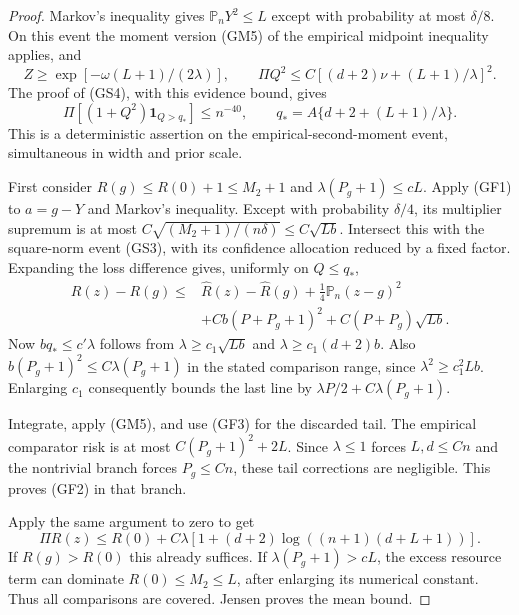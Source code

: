 \begin{proof}
Markov's inequality gives $\mathbb P_nY^2\le L$ except with
probability at most $\delta/8$. On this event the moment version
(GM5) of the empirical midpoint inequality applies, and
\[
 Z\ge\exp[-\omega(L+1)/(2\lambda)],\qquad
 \Pi Q^2\le C[(d+2)\nu+(L+1)/\lambda]^2.
\]
The proof of (GS4), with this evidence bound, gives
\[
 \Pi[(1+Q^2)\mathbf1_{Q>q_*}]\le n^{-40},\qquad
 q_*=A\{d+2+(L+1)/\lambda\}.                           \tag{GF3}
\]
This is a deterministic assertion on the empirical-second-moment
event, simultaneous in width and prior scale.

First consider $R(g)\le R(0)+1\le M_2+1$ and
$\lambda(P_g+1)\le cL$. Apply (GF1) to $a=g-Y$ and Markov's
inequality. Except with probability $\delta/4$, its multiplier
supremum is at most $C\sqrt{(M_2+1)/(n\delta)}\le C\sqrt{Lb}$.
Intersect this with the square-norm event (GS3), with its confidence
allocation reduced by a fixed factor. Expanding the loss difference
gives, uniformly on $Q\le q_*$,
\begin{align*}
 R(z)-R(g)\le{}&\widehat R(z)-\widehat R(g)
       +\tfrac14\mathbb P_n(z-g)^2\\
       &+Cb(P+P_g+1)^2+C(P+P_g)\sqrt{Lb}.
\end{align*}
Now $bq_*\le c'\lambda$ follows from
$\lambda\ge c_1\sqrt{Lb}$ and $\lambda\ge c_1(d+2)b$.
Also $b(P_g+1)^2\le C\lambda(P_g+1)$ in the stated comparison
range, since $\lambda^2\ge c_1^2Lb$.
Enlarging $c_1$ consequently bounds the last line by
$\lambda P/2+C\lambda(P_g+1)$.

Integrate, apply (GM5), and use (GF3) for the discarded tail.
The empirical comparator risk is at most $C(P_g+1)^2+2L$.
Since $\lambda\le1$ forces $L,d\le Cn$ and the nontrivial branch
forces $P_g\le Cn$, these tail corrections are negligible.
This proves (GF2) in that branch.

Apply the same argument to zero to get
\[
 \Pi R(z)\le R(0)+C\lambda
              [1+(d+2)\log((n+1)(d+L+1))].
\]
If $R(g)>R(0)$ this already suffices. If
$\lambda(P_g+1)>cL$, the excess resource term can dominate
$R(0)\le M_2\le L$, after enlarging its numerical constant.
Thus all comparisons are covered. Jensen proves the mean bound.
\end{proof}

